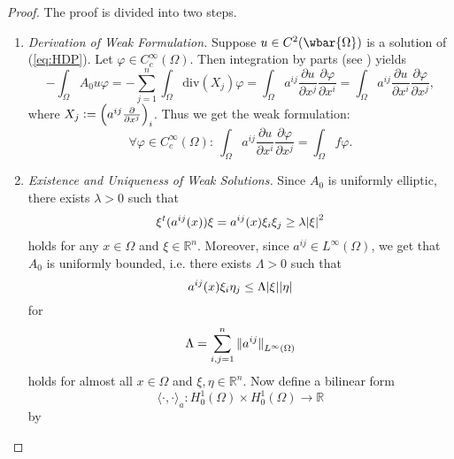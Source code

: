 \begin{proof}
	The proof is divided into two steps.
	\begin{enumerate}[label = \textit{Step \arabic*:},wide=0pt]
		\item \textit{Derivation of Weak Formulation.} Suppose $u \in C^2(\wbar{\Omega})$ is a solution of (\ref{eq:HDP}). Let $\varphi \in C^\infty_c(\Omega)$. Then integration by parts (see \cite[436]{lee:smooth_manifolds:2013}) yields
			\begin{equation*}
				-\int_\Omega A_0u \varphi = - \sum_{j = 1}^n \int_\Omega \mathrm{div}(X_j)\varphi = \int_\Omega a^{ij} \frac{\partial u}{\partial x^j}\frac{\partial \varphi}{\partial x^i} = \int_\Omega a^{ij} \frac{\partial u}{\partial x^i}\frac{\partial \varphi}{\partial x^j},
			\end{equation*}
			\noindent where $X_j := \del[2]{a^{ij}\frac{\partial}{\partial x^j}}_i$. Thus we get the weak formulation:
			\begin{equation}
				\label{eq:HDPweak}
				\forall \varphi \in C^\infty_c(\Omega):\>\int_\Omega a^{ij} \frac{\partial u}{\partial x^i}\frac{\partial \varphi}{\partial x^j} = \int_\Omega f \varphi.
			\end{equation}
		\item \textit{Existence and Uniqueness of Weak Solutions.} Since $A_0$ is uniformly elliptic, there exists $\lambda > 0$ such that 
			\begin{equation*}
				\xi^t(a^{ij}(x))\xi = a^{ij}(x) \xi_i \xi_j \geq \lambda \abs{\xi}^2
			\end{equation*}
			\noindent holds for any $x \in \Omega$ and $\xi \in \mathbb{R}^n$. Moreover, since $a^{ij} \in L^\infty(\Omega)$, we get that $A_0$ is uniformly bounded, i.e. there exists $\Lambda > 0$ such that
			\begin{equation*}
				a^{ij}(x) \xi_i \eta_j \leq \Lambda \abs{\xi}\abs{\eta}
			\end{equation*}
			\noindent for
			\begin{equation*}
				\Lambda = \sum_{i,j = 1}^n \norm[0]{a^{ij}}_{L^\infty(\Omega)}
			\end{equation*}
			\noindent holds for almost all $x \in \Omega$ and $\xi,\eta \in \mathbb{R}^n$. Now define a bilinear form 
			\begin{equation*}
				\langle \cdot,\cdot \rangle_a : H^1_0(\Omega) \times H^1_0(\Omega) \to \mathbb{R}
			\end{equation*}
			\noindent by
			\begin{equation}

\end{equation}
\end{enumerate}
\end{proof}
